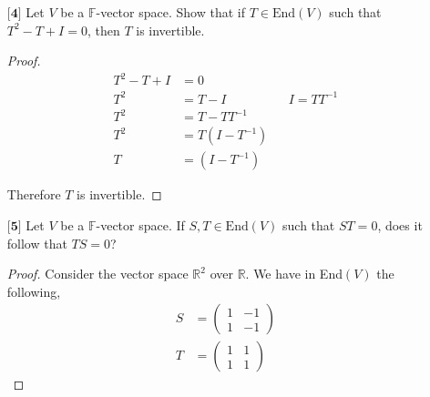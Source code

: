 \documentclass[12pt]{article}
\newcommand      {\Rm}         {{\mathbb R}}
\begin{document}
\begin{itemize}
\begin{proof}
        We know it holds for $k = n$ and thus by induction it holds for $k = n+1$
    \end{proof}
    
    \vspace{.5cm}
    \item[$\textbf{[4]}$]
    Let $V$ be a $\mathbb{F}$-vector space. Show that if $T \in \text{End}(V)$ such that $T^2 - T + I = 0$, then $T$ is invertible. 
    \begin{proof}
        \begin{align*}
            T^2 - T + I &= 0 \\ 
            T^2 &= T-I && I = TT^{-1} \\
            T^2 &= T-TT^{-1} \\
            T^2 &= T(I - T^{-1}) \\
            T &= (I - T^{-1})
        \end{align*}

        Therefore $T$ is invertible. 
    \end{proof}
    \vspace{.5cm}
    \item[$\textbf{[5]}$]
    Let $V$ be a $\mathbb{F}$-vector space. If $S,T \in \text{End}(V)$ such that $ST = 0$, does it follow that $TS = 0$?
    \begin{proof}
        Consider the vector space $\Rm^2$ over $\Rm$. We have in End$(V)$ the following,
        \begin{align*}
            S &= \begin{pmatrix}
                1 & -1 \\ 1 & -1
            \end{pmatrix} \\
            T &= \begin{pmatrix}
                1 & 1 \\ 1 & 1
            \end{pmatrix}
        \end{align*}


\end{proof}
\end{itemize}
\end{document}
